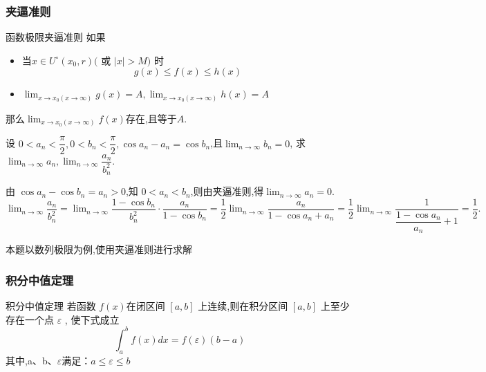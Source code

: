 \documentclass[8pt a4paper, oneside, UTF8]{ctexbook}
\begin{document}
\begin{sloppypar}
    \subsubsection{夹逼准则}
    \begin{defn}{函数极限夹逼准则}{}
        如果
        \begin{itemize}
            \item 当$x\in U^{\circ}(x_{0},r)($ 或 $|x|>M)$ 时
                  $$
                      g(x)\leqslant f(x) \leqslant h(x)
                  $$
            \item $\lim_{x\to x_0(x\to\infty)}g(x)=A,\lim_{x\to x_0(x\to\infty)}h(x)=A$
        \end{itemize}
        那么$\lim_{x\to x_0(x\to\infty)}f(x)$存在,且等于$A$.
    \end{defn}
    \begin{problem}
    设 $0<a_n<\dfrac{\pi}{2},0<b_n<\dfrac{\pi}{2} , \cos a_n-a_n=\cos b_n$,且$\lim_{n\to\infty}b_n=0$, 求$\lim_{n\to\infty}a_n , \lim_{n\to\infty}\dfrac{a_n}{b_n^2}$.
    \end{problem}
    \begin{solution}
        由 $\cos a_n-\cos b_n=a_n>0$,知 $0<a_n<b_n$,则由夹逼准则,得$\lim_{n\to \infty} a_n =0.$\\
        $\lim_{n\to\infty}\dfrac{a_n}{b_n^2}=\lim_{n\to\infty}\dfrac{1-\cos b_n}{b_n^2} \cdot \dfrac{a_n}{1-\cos b_n}=\dfrac{1}{2}\lim_{n\to\infty}\dfrac{a_n}{1-\cos a_n+a_n}=\dfrac{1}{2}\lim_{n\to\infty}\dfrac{1}{\dfrac{1-\cos a_n}{a_n}+1}=\dfrac{1}{2}.$
    \end{solution}
    \begin{note}
        本题以数列极限为例,使用夹逼准则进行求解
    \end{note}
    \subsubsection{积分中值定理}\label{jfzz1}
    \begin{defn}{积分中值定理}{}
        若函数 $f\left(x\right)$在闭区间 $[a,b]$ 上连续,则在积分区间 $[a,b]$ 上至少存在一个点 $\varepsilon$ , 使下式成立
        $$
            \int_a^bf\left(x\right)dx=f\left(\varepsilon\right)\left(b-a\right)
        $$
        其中,a、b、$\varepsilon$满足：$a\leq\varepsilon\leq b$
    \end{defn}

\end{sloppypar}
\end{document}
